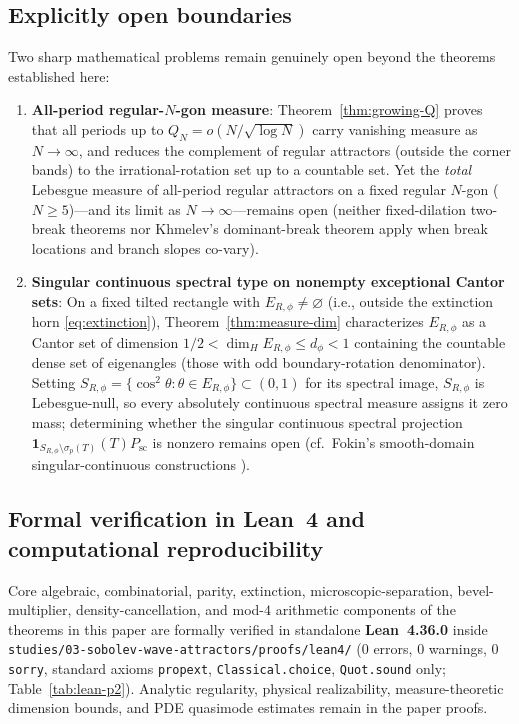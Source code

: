 \documentclass[11pt,reqno]{amsart}
\theoremstyle{definition}
\theoremstyle{remark}
\begin{document}
\subsection{Explicitly open boundaries}
Two sharp mathematical problems remain genuinely open beyond the theorems established here:
\begin{enumerate}
  \item \textbf{All-period regular-$N$-gon measure}: Theorem~\ref{thm:growing-Q} proves that all periods up to $Q_N = o(N/\sqrt{\log N})$ carry vanishing measure as $N \to \infty$, and reduces the complement of regular attractors (outside the corner bands) to the irrational-rotation set up to a countable set. Yet the \emph{total} Lebesgue measure of all-period regular attractors on a fixed regular $N$-gon ($N \ge 5$)---and its limit as $N \to \infty$---remains open (neither fixed-dilation two-break theorems \cite{LBC2023} nor Khmelev's dominant-break theorem \cite{Khmelev2005} apply when break locations and branch slopes co-vary).
  \item \textbf{Singular continuous spectral type on nonempty exceptional Cantor sets}: On a fixed tilted rectangle with $E_{R,\phi} \ne \varnothing$ (i.e., outside the extinction horn \eqref{eq:extinction}), Theorem~\ref{thm:measure-dim} characterizes $E_{R,\phi}$ as a Cantor set of dimension $1/2 < \dim_H E_{R,\phi} \le d_\phi < 1$ containing the countable dense set of eigenangles (those with odd boundary-rotation denominator). Setting $S_{R,\phi} = \{\cos^2\theta : \theta \in E_{R,\phi}\} \subset (0,1)$ for its spectral image, $S_{R,\phi}$ is Lebesgue-null, so every absolutely continuous spectral measure assigns it zero mass; determining whether the singular continuous spectral projection $\mathbf{1}_{S_{R,\phi}\setminus\sigma_p(T)}(T) P_{\mathrm{sc}}$ is nonzero remains open (cf.\ Fokin's smooth-domain singular-continuous constructions \cite{Fokin1994}).
\end{enumerate}

\subsection{Formal verification in Lean~4 and computational reproducibility}
Core algebraic, combinatorial, parity, extinction, microscopic-separation, bevel-multiplier, density-cancellation, and mod-$4$ arithmetic components of the theorems in this paper are formally verified in standalone \textbf{Lean~4.36.0} inside \texttt{studies/03-sobolev-wave-attractors/proofs/lean4/} (0 errors, 0 warnings, 0 \texttt{sorry}, standard axioms \texttt{propext}, \texttt{Classical.choice}, \texttt{Quot.sound} only; Table~\ref{tab:lean-p2}). Analytic regularity, physical realizability, measure-theoretic dimension bounds, and PDE quasimode estimates remain in the paper proofs.
\end{document}
